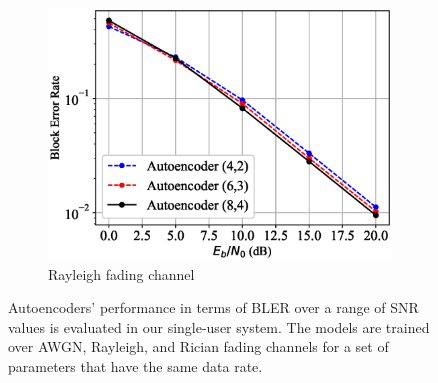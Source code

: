 \begin{figure}[!tp]
\begin{subfigure}{0.28\textwidth}
		\includegraphics[width=\linewidth]{figs/autoencoder_bler_rayleigh}
		\caption{Rayleigh fading channel}	
	\end{subfigure}
	\caption{Autoencoders' performance in terms of BLER over a range of SNR values is evaluated in our single-user system. The models are trained over AWGN, Rayleigh, and Rician fading channels for a set of parameters that have the same data rate.}
	\label{fig:autoencoder_bler}
\end{figure}

